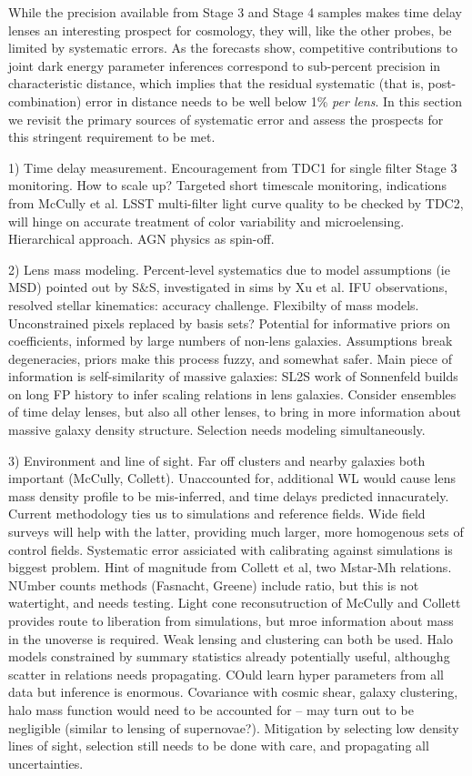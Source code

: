 While the precision available from Stage 3 and Stage 4 samples makes
time delay lenses an interesting prospect for cosmology, they will, like
the other probes, be limited by systematic errors. As the forecasts
show, competitive contributions to joint dark energy parameter
inferences correspond to sub-percent precision in characteristic distance,
which implies that the residual systematic
(that is, post-combination) error in  distance needs to be well below 1\% {\it
per lens}. In this section we revisit the primary sources of systematic
error and  assess the prospects for this stringent requirement to be
met.

1) Time delay measurement. Encouragement from TDC1 for single filter
Stage 3 monitoring. How to scale up? Targeted short timescale
monitoring, indications from McCully et al. LSST multi-filter light
curve quality to be checked by TDC2, will hinge on accurate treatment of
color variability and microelensing. Hierarchical approach. AGN physics
as spin-off.

2) Lens mass modeling. Percent-level systematics due to model
assumptions (ie MSD) pointed out by S\&S, investigated in sims by Xu et
al.  IFU observations, resolved stellar kinematics: accuracy challenge.
Flexibilty of mass models. Unconstrained pixels replaced by basis sets?
Potential for  informative priors on coefficients, informed by large
numbers of non-lens galaxies.  Assumptions break degeneracies, priors
make this process fuzzy, and somewhat safer. Main piece of information
is self-similarity of massive galaxies:  SL2S work of Sonnenfeld builds
on long FP history to infer scaling  relations in lens galaxies.
Consider ensembles of time delay lenses,  but also all other lenses, to
bring in more information about massive galaxy density structure. Selection
needs modeling simultaneously.

3) Environment and line of sight. Far off clusters and nearby galaxies
both important (McCully, Collett). Unaccounted for, additional WL
would cause lens mass density profile to be mis-inferred, and
time delays predicted innacurately.
Current methodology ties us to
simulations and reference fields. Wide field surveys will help with the
latter, providing much larger, more homogenous sets of control fields.
Systematic error assiciated with calibrating against simulations is
biggest problem. Hint of magnitude from Collett et al, two Mstar-Mh
relations. NUmber counts methods (Fasnacht, Greene) include ratio, but
this is not  watertight, and needs testing. Light cone reconsutruction
of McCully and Collett provides route to liberation from simulations,
but mroe information about  mass in the unoverse is required. Weak
lensing and clustering can both be used. Halo models constrained by
summary statistics already potentially  useful, althoughg scatter in
relations needs propagating.  COuld learn hyper parameters from all data
but inference is enormous. Covariance with cosmic shear, galaxy
clustering, halo mass function would need to be accounted for -- may
turn out to be negligible (similar to lensing of supernovae?). Mitigation
by selecting low density lines of sight, selection still needs to be done
with care, and propagating all uncertainties.


